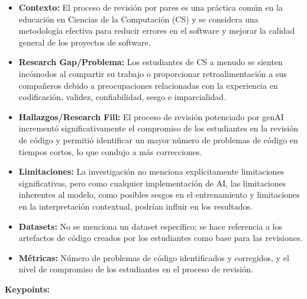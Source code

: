 \documentclass{article}
\begin{document}
\begin{itemize}
    \item \textbf{Contexto:} El proceso de revisión por pares es una práctica común en la educación en Ciencias de la Computación (CS) y se considera una metodología efectiva para reducir errores en el software y mejorar la calidad general de los proyectos de software.
    \item \textbf{Research Gap/Problema:} Los estudiantes de CS a menudo se sienten incómodos al compartir su trabajo o proporcionar retroalimentación a sus compañeros debido a preocupaciones relacionadas con la experiencia en codificación, validez, confiabilidad, sesgo e imparcialidad.
    \item \textbf{Hallazgos/Research Fill:} El proceso de revisión potenciado por genAI incrementó significativamente el compromiso de los estudiantes en la revisión de código y permitió identificar un mayor número de problemas de código en tiempos cortos, lo que condujo a más correcciones.
    \item \textbf{Limitaciones:} La investigación no menciona explícitamente limitaciones significativas, pero como cualquier implementación de AI, las limitaciones inherentes al modelo, como posibles sesgos en el entrenamiento y limitaciones en la interpretación contextual, podrían influir en los resultados.
    \item \textbf{Datasets:} No se menciona un dataset específico; se hace referencia a los artefactos de código creados por los estudiantes como base para las revisiones.
    \item \textbf{Métricas:} Número de problemas de código identificados y corregidos, y el nivel de compromiso de los estudiantes en el proceso de revisión.
\end{itemize}

\textbf{Keypoints:}
\end{document}
